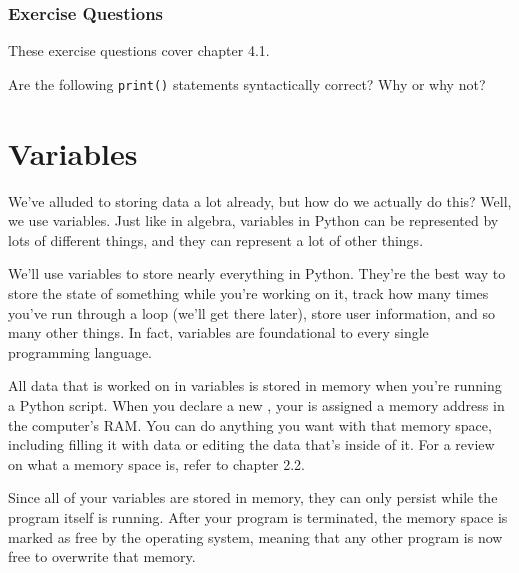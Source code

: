 \subsubsection*{Exercise Questions}
These exercise questions cover chapter 4.1.
\begin{Exercise}
\end{Exercise}
\begin{Exercise}
\end{Exercise}
\begin{Exercise}
    Are the following \verb|print()| statements syntactically correct? Why or why not?
\end{Exercise}

\section{Variables}
We've alluded to storing data a lot already, but how do we actually do this? Well, we use variables. Just like in algebra, variables in Python can be represented by lots of different things, and they can represent a lot of other things.\par
We'll use variables to store nearly everything in Python. They're the best way to store the state of something while you're working on it, track how many times you've run through a loop (we'll get there later), store user information, and so many other things. In fact, variables are foundational to every single programming language.\par
All data that is worked on in variables is stored in memory when you're running a Python script. When you declare a new , your  is assigned a memory address in the computer's RAM. You can do anything you want with that memory space, including filling it with data or editing the data that's inside of it. For a review on what a memory space is, refer to chapter 2.2.\par
Since all of your variables are stored in memory, they can only persist while the program itself is running. After your program is terminated, the memory space is marked as free by the operating system, meaning that any other program is now free to overwrite that memory. \par
